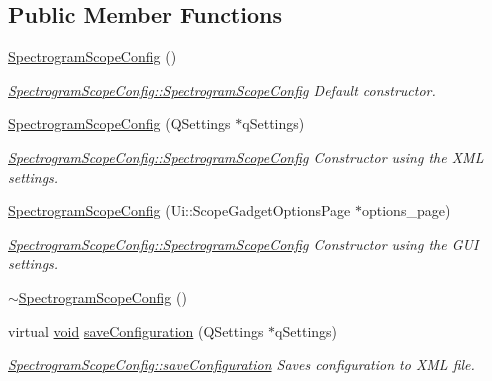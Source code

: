 \subsection*{\-Public \-Member \-Functions}
\begin{DoxyCompactItemize}
\item 
\hyperlink{group___scope_plugin_ga28b2d6eb7e9d8b459d67cef767b92fc5}{\-Spectrogram\-Scope\-Config} ()
\begin{DoxyCompactList}\small\item\em \hyperlink{group___scope_plugin_ga28b2d6eb7e9d8b459d67cef767b92fc5}{\-Spectrogram\-Scope\-Config\-::\-Spectrogram\-Scope\-Config} \-Default constructor. \end{DoxyCompactList}\item 
\hyperlink{group___scope_plugin_ga8acde1e8cd1057e318cdccaa2d2935b4}{\-Spectrogram\-Scope\-Config} (\-Q\-Settings $\ast$q\-Settings)
\begin{DoxyCompactList}\small\item\em \hyperlink{group___scope_plugin_ga28b2d6eb7e9d8b459d67cef767b92fc5}{\-Spectrogram\-Scope\-Config\-::\-Spectrogram\-Scope\-Config} \-Constructor using the \-X\-M\-L settings. \end{DoxyCompactList}\item 
\hyperlink{group___scope_plugin_ga40e298cc36738756669408e5cb4d4166}{\-Spectrogram\-Scope\-Config} (\-Ui\-::\-Scope\-Gadget\-Options\-Page $\ast$options\-\_\-page)
\begin{DoxyCompactList}\small\item\em \hyperlink{group___scope_plugin_ga28b2d6eb7e9d8b459d67cef767b92fc5}{\-Spectrogram\-Scope\-Config\-::\-Spectrogram\-Scope\-Config} \-Constructor using the \-G\-U\-I settings. \end{DoxyCompactList}\item 
\hyperlink{group___scope_plugin_ga12537968c75d08027a1490766226d871}{$\sim$\-Spectrogram\-Scope\-Config} ()
\item 
virtual \hyperlink{group___u_a_v_objects_plugin_ga444cf2ff3f0ecbe028adce838d373f5c}{void} \hyperlink{group___scope_plugin_ga11e36d400c5929b6feb7c6e2fb0ba30f}{save\-Configuration} (\-Q\-Settings $\ast$q\-Settings)
\begin{DoxyCompactList}\small\item\em \hyperlink{group___scope_plugin_ga11e36d400c5929b6feb7c6e2fb0ba30f}{\-Spectrogram\-Scope\-Config\-::save\-Configuration} \-Saves configuration to \-X\-M\-L file. \end{DoxyCompactList}\item 

\end{DoxyCompactItemize}
